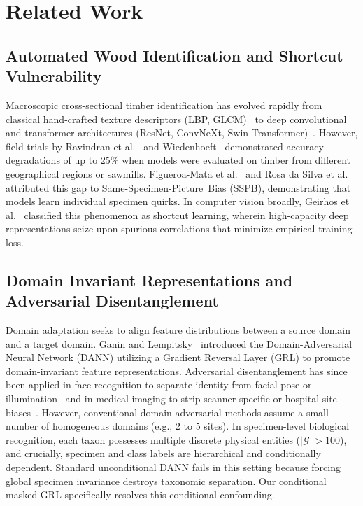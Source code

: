 \documentclass[a4paper,fleqn]{cas-sc}
\begin{document}
\section{Related Work}
\label{sec:related}

\subsection{Automated Wood Identification and Shortcut Vulnerability}
Macroscopic cross-sectional timber identification has evolved rapidly from classical hand-crafted texture descriptors (LBP, GLCM)~\cite{ravindran2019} to deep convolutional and transformer architectures (ResNet, ConvNeXt, Swin Transformer)~\cite{wu2021,fabijanska2021,song2025}. However, field trials by Ravindran et al.~\cite{ravindran2020,ravindran2021} and Wiedenhoeft~\cite{wiedenhoeft2011} demonstrated accuracy degradations of up to 25\% when models were evaluated on timber from different geographical regions or sawmills. Figueroa-Mata et al.~\cite{figueroamata2022} and Rosa da Silva et al.~\cite{rosadasilva2022} attributed this gap to \mbox{Same-Specimen-Picture Bias} (SSPB), demonstrating that models learn individual specimen quirks. In computer vision broadly, Geirhos et al.~\cite{geirhos2020} classified this phenomenon as shortcut learning, wherein high-capacity deep representations seize upon spurious correlations that minimize empirical training loss.

\subsection{Domain Invariant Representations and Adversarial Disentanglement}
Domain adaptation seeks to align feature distributions between a source domain and a target domain. Ganin and Lempitsky~\cite{ganin2015dann} introduced the Domain-Adversarial Neural Network (DANN) utilizing a Gradient Reversal Layer (GRL) to promote domain-invariant feature representations. Adversarial disentanglement has since been applied in face recognition to separate identity from facial pose or illumination~\cite{deng2019arcface} and in medical imaging to strip scanner-specific or hospital-site biases~\cite{roberts2021}. However, conventional domain-adversarial methods assume a small number of homogeneous domains (e.g., 2 to 5 sites). In specimen-level biological recognition, each taxon possesses multiple discrete physical entities ($|\mathcal{G}| > 100$), and crucially, specimen and class labels are hierarchical and conditionally dependent. Standard unconditional DANN fails in this setting because forcing global specimen invariance destroys taxonomic separation. Our conditional masked GRL specifically resolves this conditional confounding.
\end{document}
